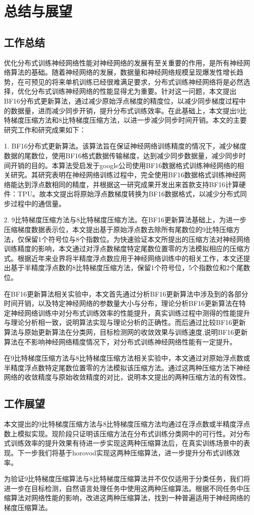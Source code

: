 \chapter{总结与展望}
\section{工作总结}
优化分布式训练神经网络性能对神经网络的发展有至关重要的作用，是所有神经网络算法的基础。随着神经网络的发展，数据量和神经网络规模呈现爆发性增长趋势，在可预见的将来单机训练已经很难满足要求，分布式训练神经网络将是必然选择，优化分布式训练神经网络的性能显得尤为重要。针对这一问题，本文提出BF16分布式更新算法，通过减少原始浮点梯度的精度位，以减少同步梯度过程中的数据量，进而减少同步开销，提升分布式训练效率。在此基础上，本文提出9比特梯度压缩方法和8比特梯度压缩方法，以进一步减少同步时间开销。本文的主要研究工作和研究成果如下：

1. BF16分布式更新算法。该算法旨在保证神经网络训练精度的情况下，减少梯度数据的尾数位，使用BF16格式数据传输梯度，达到减少同步数据量，减少同步时间开销的目的。本算法受启发于google公司使用BF16数据格式训练神经网络的相关研究。其研究表明在神经网络训练过程中，完全使用BF16数据格式训练神经网络能达到浮点数相同的精度，并根据这一研究成果开发出来首款支持BF16计算硬件：TPU。故本文提出将原始浮点数梯度转换为BF16数据格式，以减少分布式同步过程中的通信量。

2. 9比特梯度压缩方法与8比特梯度压缩方法。在BF16更新算法基础上，为进一步压缩梯度数据表示位，本文提出基于原始浮点数去除所有尾数位的9比特压缩方法，仅保留1个符号位与8个指数位。为快速验证本文所提出的压缩方法对神经网络训练精度的影响，本文通过对浮点数梯度特定尾数位置零的方法模拟相应的压缩方式。根据近年来业界将半精度浮点数应用于神经网络训练中的相关工作，本文还提出基于半精度浮点数的8比特梯度压缩方法，保留1个符号位，5个指数位和2个尾数位。

在BF16更新算法相关实验中，本文首先通过分析BF16更新算法中涉及到的各部分时间开销，以及特定神经网络的参数量大小与分布，理论分析BF16更新算法在特定神经网络训练中对分布式训练效率的性能提升，真实训练过程中测得的性能提升与理论分析相一致，说明算法实现与理论分析的正确性。而后通过比较BF16更新算法与原始更新算法在分类网，目标检测网的收敛效果与训练速度,说明BF16更新算法在不影响神经网络精度情况下，对分布式训练神经网络性能有一定提升。

在9比特梯度压缩方法与8比特梯度压缩方法相关实验中，本文通过对原始浮点数或半精度浮点数特定尾数位置零的方法模拟该压缩方法。通过这两种压缩方法下神经网络的收敛精度与原始收敛精度的对比，说明本文提出的两种压缩方法的有效性。
\section{工作展望}
本文提出的9比特梯度压缩方法与8比特梯度压缩方法均通过在浮点数或半精度浮点数上模拟实现。现阶段只证明该压缩方法在分布式训练分类网中的可行性。对分布式训练效率的提升效果有待进一步实现这两种压缩算法后，在真实训练场景中的表现。下一步我们将基于horovod实现这两种压缩算法，进一步提升分布式训练效率。

为验证9比特梯度压缩算法与8比特梯度压缩算法并不仅仅适用于分类任务，我们将进一步在目标检测，自然语言处理任务中使用这两种压缩算法。根据不同任务中压缩算法对网络性能的影响，改进这两种压缩算法，找到一种普遍适用于神经网络的梯度压缩算法。